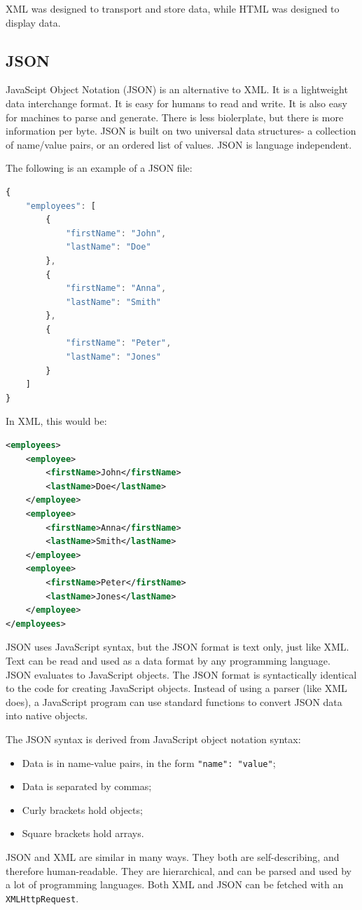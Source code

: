 \documentclass[a4paper, openany]{memoir}
\begin{document}
XML was designed to transport and store data, while HTML was designed to display data.

\subsection{JSON}
JavaScipt Object Notation (JSON) is an alternative to XML. It is a lightweight data interchange format. It is easy for humans to read and write. It is also easy for machines to parse and generate. There is less biolerplate, but there is more information per byte. JSON is built on two universal data structures- a collection of name/value pairs, or an ordered list of values. JSON is language independent.

The following is an example of a JSON file:
\begin{lstlisting}[language=javascript]
{
    "employees": [
        {
            "firstName": "John",
            "lastName": "Doe"
        },
        {
            "firstName": "Anna",
            "lastName": "Smith"
        },
        {
            "firstName": "Peter",
            "lastName": "Jones"
        }
    ]
}
\end{lstlisting}
In XML, this would be:
\begin{lstlisting}[language=xml]
<employees>
    <employee>
        <firstName>John</firstName>
        <lastName>Doe</lastName>
    </employee>
    <employee>
        <firstName>Anna</firstName>
        <lastName>Smith</lastName>
    </employee>
    <employee>
        <firstName>Peter</firstName>
        <lastName>Jones</lastName>
    </employee>
</employees>
\end{lstlisting}
JSON uses JavaScript syntax, but the JSON format is text only, just like XML. Text can be read and used as a data format by any programming language. JSON evaluates to JavaScript objects. The JSON format is syntactically identical to the code for creating JavaScript objects. Instead of using a parser (like XML does), a JavaScript program can use standard functions to convert JSON data into native objects.

The JSON syntax is derived from JavaScript object notation syntax:
\begin{itemize}
    \item Data is in name-value pairs, in the form \texttt{"name": "value"};
    \item Data is separated by commas;
    \item Curly brackets hold objects;
    \item Square brackets hold arrays.
\end{itemize}
JSON and XML are similar in many ways. They both are self-describing, and therefore human-readable. They are hierarchical, and can be parsed and used by a lot of programming languages. Both XML and JSON can be fetched with an \texttt{XMLHttpRequest}.
\end{document}
